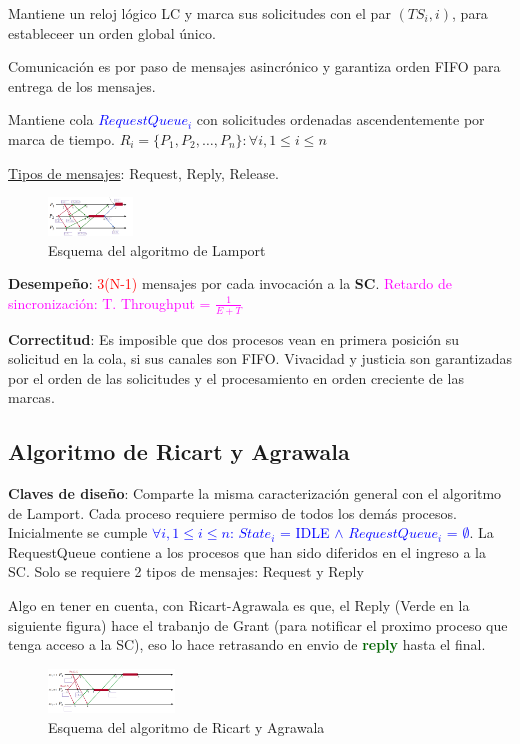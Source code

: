 Mantiene un reloj lógico LC y marca sus solicitudes con el par $(TS_i, i)$, para estableceer un orden global único. 

Comunicación es por paso de mensajes asincrónico y garantiza orden FIFO para entrega de los mensajes. 

Mantiene cola \textcolor{blue}{$RequestQueue_i$} con solicitudes ordenadas ascendentemente por marca de tiempo. $R_i = \{P_1, P_2, \ldots, P_n\} : \forall i, 1 \leq i \leq n$

\vspace{0.5em}

\underline{Tipos de mensajes}: Request, Reply, Release.

\begin{figure}[H]
    \centering
    \includegraphics[width=0.2\textwidth]{img/A_Lamport.png}
    \caption{Esquema del algoritmo de Lamport}
\end{figure}

\textbf{Desempeño}: \textcolor{red}{3(N-1)} mensajes por cada invocación a la \textbf{SC}. \textcolor{magenta}{Retardo de sincronización: T. Throughput = $\frac{1}{E+T}$}

\textbf{Correctitud}: Es imposible que dos procesos vean en primera posición su solicitud en la cola, si sus canales son FIFO. Vivacidad y justicia son garantizadas por el orden de las solicitudes y el procesamiento en orden creciente de las marcas.

\subsection{Algoritmo de Ricart y Agrawala}

\textbf{Claves de diseño}: Comparte la misma caracterización general con el algoritmo de Lamport. Cada proceso requiere permiso de todos los demás procesos. Inicialmente se cumple \textcolor{blue}{$\forall i, 1 \leq i \leq n$: $State_i$ = IDLE $\wedge$ $RequestQueue_i$ = $\emptyset$}. La RequestQueue contiene a los procesos que han sido diferidos en el ingreso a la SC. Solo se requiere 2 tipos de mensajes: Request y Reply

Algo en tener en cuenta, con Ricart-Agrawala es que, el Reply (Verde en la siguiente figura) hace el trabanjo de Grant (para notificar el proximo proceso que tenga acceso a la SC), eso lo hace retrasando en envio de \textcolor{darkgreen}{\textbf{reply}} hasta el final.
\begin{figure}[H]
    \centering
    \includegraphics[width=0.3\textwidth]{img/A_Ricart_Agrawala.png}
    \caption{Esquema del algoritmo de Ricart y Agrawala}
\end{figure}

